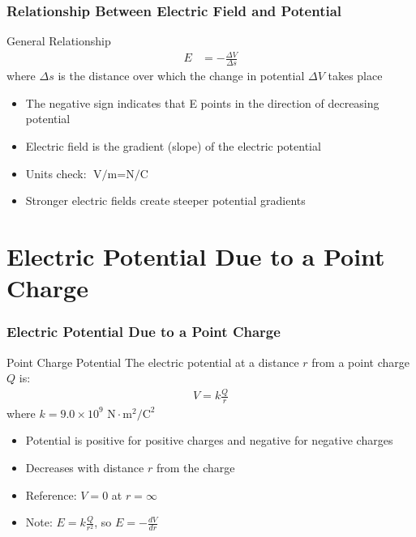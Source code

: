 \documentclass{beamer}
\begin{document}
\begin{frame}
    \frametitle{Relationship Between Electric Field and Potential}
    
    \begin{block}{General Relationship}
        \begin{align}
            E &= -\frac{\Delta V}{\Delta s}
        \end{align}
        where $\Delta s$ is the distance over which the change in potential $\Delta V$ takes place
    \end{block}
    
    \begin{itemize}
        \item The negative sign indicates that E points in the direction of decreasing potential
        \item Electric field is the gradient (slope) of the electric potential
        \item Units check: $\text{V/m} = \text{N/C}$
        \item Stronger electric fields create steeper potential gradients
    \end{itemize}
\end{frame}

\section{Electric Potential Due to a Point Charge}

\begin{frame}
    \frametitle{Electric Potential Due to a Point Charge}
    
    \begin{block}{Point Charge Potential}
        The electric potential at a distance $r$ from a point charge $Q$ is:
        \begin{align}
            V = k\frac{Q}{r}
        \end{align}
        where $k = 9.0 \times 10^9 \text{ N}\cdot\text{m}^2/\text{C}^2$
    \end{block}
    
    \begin{itemize}
        \item Potential is positive for positive charges and negative for negative charges
        \item Decreases with distance $r$ from the charge
        \item Reference: $V = 0$ at $r = \infty$
        \item Note: $E = k\frac{Q}{r^2}$, so $E = -\frac{dV}{dr}$
    \end{itemize}
\end{frame}
\end{document}
